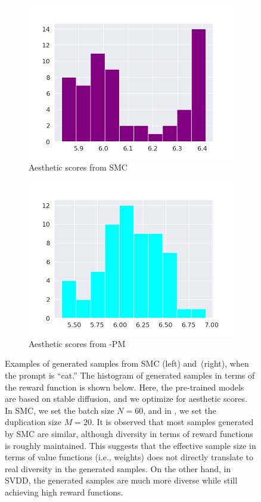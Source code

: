 {\begin{figure}[!t]
\begin{subfigure}[b]{0.48\textwidth}
     \includegraphics[width= 0.7 \linewidth]{images/SMC_hist.png}
          \caption{Aesthetic scores from SMC}
       \end{subfigure}
         \begin{subfigure}[b]{0.48\textwidth} 
     \includegraphics[width=0.7\linewidth]{images/PM_hist.png}
          \caption{Aesthetic scores from \alg-PM}
       \end{subfigure}
       
    \caption{Examples of generated samples from SMC (left) and \alg\,(right), when the prompt is ``cat.'' The histogram of generated samples in terms of the reward function is shown below. Here, the pre-trained models are based on stable diffusion, and we optimize for aesthetic scores. In SMC, we set the batch size $N=60$, and in \alg, we set the duplication size $M=20$. It is observed that most samples generated by SMC are similar, although diversity in terms of reward functions is roughly maintained. This suggests that the effective sample size in terms of value functions (i.e., weights) does not directly translate to real diversity in the generated samples. On the other hand, in SVDD, the generated samples are much more diverse while still achieving high reward functions.    
    }
    \label{fig:dif_SMC_SVDD}
\end{figure}
}

